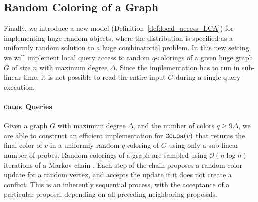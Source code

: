 \subsection{Random Coloring of a Graph}
\label{sec:overview_random_coloring_of_a_graph}
Finally, we introduce a new model (Definition~\ref{def:local_access_LCA}) for implementing huge random objects,
where the distribution is specified as a uniformly random solution to a huge combinatorial problem.
In this new setting, we will implement local query access to random $q$-colorings of a given huge graph $G$ of size $n$ with maximum degree $\Delta$.
Since the implementation has to run in sub-linear time, it is not possible to read the entire input $G$ during a single query execution.


\paragraph*{$\texttt{\textsc{Color}}$ Queries}
\label{par:color_queries}
Given a graph $G$ with maximum degree $\Delta$, and the number of colors $q\ge 9\Delta$,
we are able to construct an efficient implementation for $\texttt{\textsc{Color}}(v)$ that returns the final color of $v$
in a uniformly random $q$-coloring of $G$ using only a sub-linear number of probes.
Random colorings of a graph are sampled using $\mathcal O(n\log n)$ iterations of a Markov chain \cite{glauber_survey}.
Each step of the chain proposes a random color update for a random vertex, and accepts the update if it does not create a conflict.
This is an inherently sequential process, with the acceptance of a particular proposal depending on all preceding neighboring proposals.

